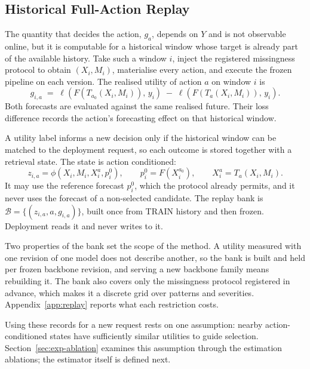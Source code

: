 \documentclass{article}
\newcommand{\calB}{\mathcal{B}}
\newcommand{\loss}{\ell}
\begin{document}
\subsection{Historical Full-Action Replay}
\label{sec:method-replay}
The quantity that decides the action, $g_a$, depends on $Y$ and is not observable online, but it
is computable for a historical window whose target is already part of the available history.
Take such a window $i$, inject the registered missingness protocol to obtain $(X_i, M_i)$,
materialise every action, and execute the frozen pipeline on each version. The realised utility
of action $a$ on window $i$ is
\begin{equation}
  g_{i,a} \;=\; \loss\!\left(F(T_{a_0}(X_i, M_i)),\, y_i\right)
  \;-\; \loss\!\left(F(T_{a}(X_i, M_i)),\, y_i\right).
  \label{eq:replay-gain}
\end{equation}
Both forecasts are evaluated against the same realised future. Their loss difference records
the action's forecasting effect on that historical window.

A utility label informs a new decision only if the historical window can be matched to the
deployment request, so each outcome is stored together with a retrieval state. The state is
action conditioned:
\begin{equation}
  z_{i,a} = \phi(X_i, M_i, X_i^{a}, p_i^{0}),
  \qquad p_i^{0} = F(X_i^{a_0}),
  \qquad X_i^{a} = T_a(X_i, M_i).
  \label{eq:state}
\end{equation}
It may use the reference forecast $p_i^0$, which the
protocol already permits, and it never uses the forecast of a non-selected candidate. The
replay bank is $\calB = \{(z_{i,a}, a, g_{i,a})\}$, built once from TRAIN history and then
frozen. Deployment reads it and never writes to it.

Two properties of the bank set the scope of the method. A utility measured with one revision
of one model does not describe another, so the bank is built and held per frozen backbone
revision, and serving a new backbone family means rebuilding it. The bank also covers only the
missingness protocol registered in advance, which makes it a discrete grid over patterns and
severities.
Appendix~\ref{app:replay} reports what each restriction costs.

Using these records for a new request rests on one assumption: nearby action-conditioned
states have sufficiently similar utilities to guide selection. Section~\ref{sec:exp-ablation}
examines this assumption through the estimation ablations; the estimator itself is defined next.
\end{document}
